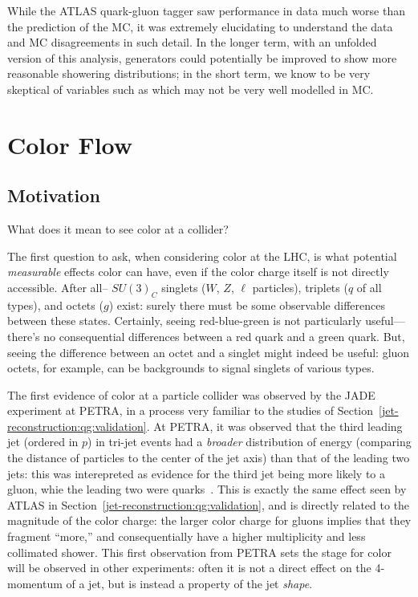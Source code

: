 While the ATLAS quark-gluon tagger saw performance in data much worse than the prediction of the \Pythia MC, it was extremely elucidating to understand the data and MC disagreements in such detail. In the longer term, with an unfolded version of this analysis, generators could potentially be improved to show more reasonable showering distributions; in the short term, we know to be very skeptical of variables such as \ntrk which may not be very well modelled in MC.

\FloatBarrier

\section{Color Flow}

\subsection{Motivation}

What does it mean to see color at a collider?

The first question to ask, when considering color at the LHC, is what potential \textit{measurable} effects color can have, even if the color charge itself is not directly accessible. After all-- $SU(3)_C$ singlets ($W$, $Z$, $\ell$ particles), triplets ($q$ of all types), and octets ($g$) exist: surely there must be some observable differences between these states. Certainly, seeing red-blue-green is not particularly useful--- there's no consequential differences between a red quark and a green quark. But, seeing the difference between an octet and a singlet might indeed be useful: gluon octets, for example, can be backgrounds to signal singlets of various types. 

The first evidence of color at a particle collider was observed by the JADE experiment at PETRA, in a process very familiar to the studies of Section~\ref{jet-reconstruction:qg:validation}. At PETRA, it was observed that the third leading jet (ordered in $p$) in tri-jet events had a \textit{broader} distribution of energy (comparing the distance of particles to the center of the jet axis) than that of the leading two jets: this was interepreted as evidence for the third jet being more likely to a gluon, whie the leading two were quarks~\cite{Bartel:1983ii}. This is exactly the same effect seen by ATLAS in Section~\ref{jet-reconstruction:qg:validation}, and is directly related to the magnitude of the color charge: the larger color charge for gluons implies that they fragment ``more,'' and consequentially have a higher multiplicity and less collimated shower. This first observation from PETRA sets the stage for color will be observed in other experiments: often it is not a direct effect on the 4-momentum of a jet, but is instead a property of the jet \textit{shape}. 

